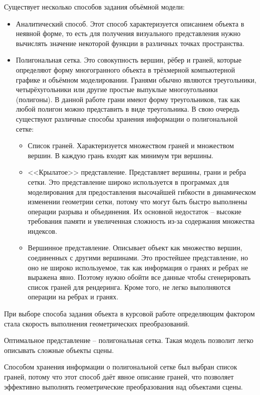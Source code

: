 Существует несколько способов задания объёмной модели:
\begin{itemize}
	\item Аналитический способ. Этот способ характеризуется описанием объекта в неявной форме, то есть для получения визуального представления нужно вычислять значение некоторой функции в различных точках пространства.
	\item Полигональная сетка. Это совокупность вершин, рёбер и граней, которые определяют форму многогранного объекта в трёхмерной компьютерной графике и объёмном моделировании. Гранями обычно являются треугольники, четырёхугольники или другие простые выпуклые многоугольники (полигоны). В данной работе грани имеют форму треугольников, так как любой полигон можно представить в виде треугольника.
	В свою очередь существуют различные способы хранения информации о полигональной сетке:
	\begin{itemize}
		\item Список граней. Характеризуется множеством граней и множеством вершин. В каждую грань входят как минимум три вершины.
		\item <<Крылатое>> представление. Представляет вершины, грани и ребра сетки. Это представление широко используется в программах для моделирования для предоставления высочайшей гибкости в динамическом изменении геометрии сетки, потому что могут быть быстро выполнены операции разрыва и объединения. Их основной недостаток -- высокие требования памяти и увеличенная сложность из-за содержания множества индексов.
		\item Вершинное представление. Описывает объект как множество вершин, соединенных с другими вершинами. Это простейшее представление, но оно не широко используемое, так как информация о гранях и ребрах не выражена явно. Поэтому нужно обойти все данные чтобы сгенерировать список граней для рендеринга. Кроме того, не легко выполняются операции на ребрах и гранях.
	\end{itemize}
\end{itemize}

При выборе способа задания объекта в курсовой работе определяющим фактором стала скорость выполнения геометрических преобразований.

Оптимальное представление -- полигональная сетка. Такая модель позволит легко описывать сложные объекты сцены. 

Способом хранения информации о полигональной сетке был выбран список граней, потому что этот способ даёт явное описание граней, что позволяет эффективно выполнять геометрические преобразования над объектами сцены.

